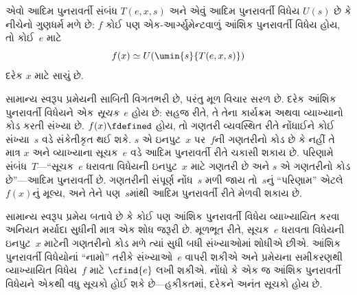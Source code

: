 \documentclass[../../../include/open-logic-section]{subfiles}
\begin{document}

\begin{thm}[ક્લીનીનું સામાન્ય સ્વરૂપ પ્રમેય]
એવો આદિમ પુનરાવર્તી સંબંધ $T(e, x, s)$ અને એવું આદિમ
પુનરાવર્તી વિધેય $U(s)$ છે કે નીચેનો ગુણધર્મ મળે છે: $f$ કોઈ પણ
એક-આર્ગ્યુમેન્ટવાળું આંશિક પુનરાવર્તી વિધેય હોય, તો કોઈ~$e$ માટે
\[
f(x) \simeq U(\umin{s}{T(e, x, s)})
\]
દરેક $x$ માટે સાચું છે.
\end{thm}

\begin{explain}
સામાન્ય સ્વરૂપ પ્રમેયની સાબિતી વિગતભરી છે, પરંતુ મૂળ વિચાર સરળ
છે. દરેક આંશિક પુનરાવર્તી વિધેયને એક \emph{સૂચક}~$e$ હોય છે:
સહજ રીતે, તે તેના કાર્યક્રમ અથવા વ્યાખ્યાનો કોડ કરતી સંખ્યા છે.
$f(x)
\fdefined$ હોય, તો ગણતરી વ્યવસ્થિત રીતે નોંધાઈને કોઈ સંખ્યા~$s$
વડે સંકેતીકૃત થઈ શકે. $s$ એ ઇનપુટ~$x$ પર~$f$ની ગણતરીનો કોડ
છે કે નહીં તે માત્ર $x$ અને વ્યાખ્યાના સૂચક~$e$ વડે આદિમ
પુનરાવર્તી રીતે ચકાસી શકાય છે. પરિણામે સંબંધ~$T$---``સૂચક~$e$
ધરાવતા વિધેયની ઇનપુટ~$x$ માટે ગણતરી છે અને $s$ એ ગણતરીનો
કોડ છે''---આદિમ પુનરાવર્તી છે. ગણતરીની સંપૂર્ણ નોંધ~$s$ મળી જાય
તો~$s$નું ``પરિણામ'' એટલે~$f(x)$નું મૂલ્ય, અને તેને પણ~$s$માંથી
આદિમ પુનરાવર્તી રીતે મેળવી શકાય છે.

સામાન્ય સ્વરૂપ પ્રમેય બતાવે છે કે કોઈ પણ આંશિક પુનરાવર્તી વિધેય
વ્યાખ્યાયિત કરવા અનિયત મર્યાદા સુધીની માત્ર એક શોધ જરૂરી છે.
મૂળભૂત રીતે, સૂચક~$e$ ધરાવતા વિધેયની ઇનપુટ~$x$ માટેની ગણતરીનો
કોડ મળે ત્યાં સુધી બધી સંખ્યાઓમાં શોધીએ છીએ. આંશિક પુનરાવર્તી
વિધેયોનાં ``નામો'' તરીકે સંખ્યાઓ~$e$ વાપરી શકીએ અને પ્રમેયના
સમીકરણથી વ્યાખ્યાયિત વિધેય~$f$ માટે $\cfind{e}$ લખી શકીએ.
નોંધો કે એક જ આંશિક પુનરાવર્તી વિધેયને એકથી વધુ સૂચકો હોઈ શકે
છે---હકીકતમાં, દરેકને અનંત સૂચકો હોય છે.
\end{explain}
\end{document}
